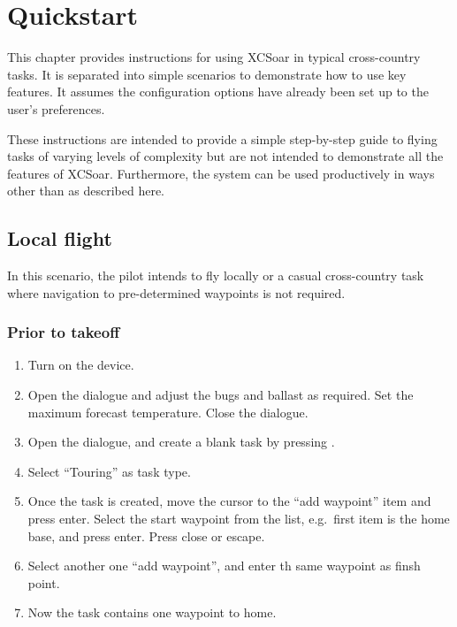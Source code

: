 \chapter{Quickstart}\label{cha:quickstart}

This chapter provides instructions for using XCSoar in typical
cross-country tasks.  It is separated into simple scenarios to
demonstrate how to use key features.  It assumes the configuration
options have already been set up to the user's preferences.

These instructions are intended to provide a simple step-by-step guide
to flying tasks of varying levels of complexity but are not intended
to demonstrate all the features of XCSoar.  Furthermore, the system
can be used productively in ways other than as described here.

\section{Local flight}\label{sec:local-flight}

In this scenario, the pilot intends to fly locally or a casual
cross-country task where navigation to pre-determined waypoints is not
required.

\subsection*{Prior to takeoff}
\begin{enumerate}
\item  Turn on the device.
\item  Open the  dialogue and adjust the bugs and ballast as
  required. Set the maximum forecast temperature.  Close the dialogue.
\item  Open the  dialogue, and create a blank task by pressing
.
\item  Select ``Touring'' as  task type. %
\item  Once the task is created, move the cursor to the ``add waypoint'' item
  and press enter.  Select the start waypoint from the list, e.g.\ first item is
  the home base, and press enter.
  Press close or escape.
\item Select another one ``add waypoint'', and enter th same waypoint as finsh
  point.
\item  Now the task contains one waypoint to home.
\end{enumerate}

